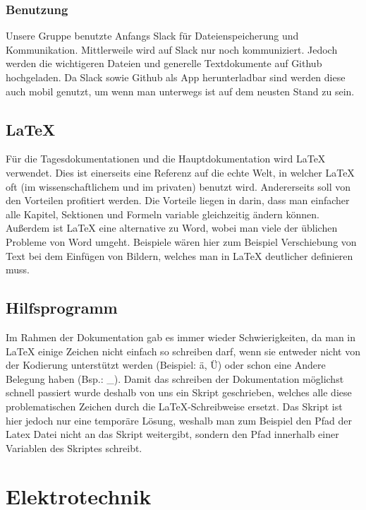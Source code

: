 \documentclass[notitlepage]{report}
\begin{document}
\subsubsection{Benutzung}

Unsere Gruppe benutzte Anfangs Slack f\"{u}r Dateienspeicherung und Kommunikation. Mittlerweile wird auf Slack nur noch kommuniziert. Jedoch werden die wichtigeren Dateien und generelle Textdokumente auf Github hochgeladen. Da Slack sowie Github als App herunterladbar sind werden  diese auch mobil genutzt, um wenn man unterwegs ist auf dem neusten Stand zu sein. 

\subsection{\LaTeX}

F\"{u}r die Tagesdokumentationen und die Hauptdokumentation wird LaTeX verwendet. Dies ist einerseits eine Referenz auf die echte Welt, in welcher LaTeX oft (im wissenschaftlichem und im privaten) benutzt wird. Andererseits soll von den Vorteilen profitiert werden. Die Vorteile liegen in darin, dass man einfacher alle Kapitel, Sektionen und Formeln variable gleichzeitig \"{a}ndern k\"{o}nnen. Au{\ss}erdem ist LaTeX eine alternative zu Word, wobei man viele der \"{u}blichen Probleme von Word umgeht. Beispiele w\"{a}ren hier zum Beispiel Verschiebung von Text bei dem Einf\"{u}gen von Bildern, welches man in LaTeX deutlicher definieren muss. 

\subsection{Hilfsprogramm}

Im Rahmen der Dokumentation gab es immer wieder Schwierigkeiten, da man in LaTeX einige Zeichen nicht einfach so schreiben darf, wenn sie entweder nicht von der Kodierung unterst\"{u}tzt werden (Beispiel: \"{a}, \"{U}) oder schon eine Andere Belegung haben (Bsp.: \_). Damit das schreiben der Dokumentation m\"{o}glichst schnell passiert wurde deshalb von uns ein Skript geschrieben, welches alle diese problematischen Zeichen durch die LaTeX-Schreibweise ersetzt. Das Skript ist hier jedoch nur eine tempor\"{a}re L\"{o}sung, weshalb man zum Beispiel den Pfad der Latex Datei nicht an das Skript weitergibt, sondern den Pfad innerhalb einer Variablen des Skriptes schreibt.

\section{Elektrotechnik}
\end{document}
